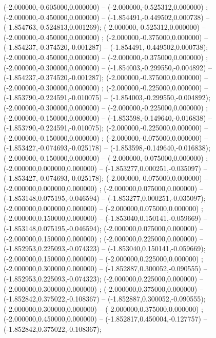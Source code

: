  (-2.000000,-0.605000,0.000000) -- (-2.000000,-0.525312,0.000000) ;
 (-2.000000,-0.450000,0.000000) -- (-1.854491,-0.449502,0.000738) -- (-1.854763,-0.524813,0.001269);
 (-2.000000,-0.525312,0.000000) -- (-2.000000,-0.450000,0.000000) ;
 (-2.000000,-0.375000,0.000000) -- (-1.854237,-0.374520,-0.001287) -- (-1.854491,-0.449502,0.000738);
 (-2.000000,-0.450000,0.000000) -- (-2.000000,-0.375000,0.000000) ;
 (-2.000000,-0.300000,0.000000) -- (-1.854003,-0.299550,-0.004892) -- (-1.854237,-0.374520,-0.001287);
 (-2.000000,-0.375000,0.000000) -- (-2.000000,-0.300000,0.000000) ;
 (-2.000000,-0.225000,0.000000) -- (-1.853790,-0.224591,-0.010075) -- (-1.854003,-0.299550,-0.004892);
 (-2.000000,-0.300000,0.000000) -- (-2.000000,-0.225000,0.000000) ;
 (-2.000000,-0.150000,0.000000) -- (-1.853598,-0.149640,-0.016838) -- (-1.853790,-0.224591,-0.010075);
 (-2.000000,-0.225000,0.000000) -- (-2.000000,-0.150000,0.000000) ;
 (-2.000000,-0.075000,0.000000) -- (-1.853427,-0.074693,-0.025178) -- (-1.853598,-0.149640,-0.016838);
 (-2.000000,-0.150000,0.000000) -- (-2.000000,-0.075000,0.000000) ;
 (-2.000000,0.000000,0.000000) -- (-1.853277,0.000251,-0.035097) -- (-1.853427,-0.074693,-0.025178);
 (-2.000000,-0.075000,0.000000) -- (-2.000000,0.000000,0.000000) ;
 (-2.000000,0.075000,0.000000) -- (-1.853148,0.075195,-0.046594) -- (-1.853277,0.000251,-0.035097);
 (-2.000000,0.000000,0.000000) -- (-2.000000,0.075000,0.000000) ;
 (-2.000000,0.150000,0.000000) -- (-1.853040,0.150141,-0.059669) -- (-1.853148,0.075195,-0.046594);
 (-2.000000,0.075000,0.000000) -- (-2.000000,0.150000,0.000000) ;
 (-2.000000,0.225000,0.000000) -- (-1.852953,0.225093,-0.074323) -- (-1.853040,0.150141,-0.059669);
 (-2.000000,0.150000,0.000000) -- (-2.000000,0.225000,0.000000) ;
 (-2.000000,0.300000,0.000000) -- (-1.852887,0.300052,-0.090555) -- (-1.852953,0.225093,-0.074323);
 (-2.000000,0.225000,0.000000) -- (-2.000000,0.300000,0.000000) ;
 (-2.000000,0.375000,0.000000) -- (-1.852842,0.375022,-0.108367) -- (-1.852887,0.300052,-0.090555);
 (-2.000000,0.300000,0.000000) -- (-2.000000,0.375000,0.000000) ;
 (-2.000000,0.450000,0.000000) -- (-1.852817,0.450004,-0.127757) -- (-1.852842,0.375022,-0.108367);
